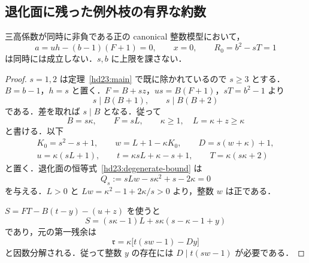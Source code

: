 \subsection{退化面に残った例外枝の有界な約数}

\begin{theorem}[退化面の例外枝の排除]
\label{ax24:degenerate-R1}
三高係数が同時に非負である正の canonical 整数模型において，
\[
 a=uh-(b-1)(F+1)=0,\qquad x=0,\qquad R_0=b^2-sT=1
\]
は同時には成立しない．$s,b$ に上限を課さない．
\end{theorem}

\begin{proof}
$s=1,2$ は定理~\ref{hd23:main} で既に除かれているので $s\ge3$ とする．
$B=b-1$，$h=s$ と置く．$F=B+sz$，$us=B(F+1)$，$sT=b^2-1$ より
\[
 s\mid B(B+1),\qquad s\mid B(B+2)
\]
である．差を取れば $s\mid B$ となる．従って
\[
 B=s\kappa,\qquad F=sL,\qquad
 \kappa\ge1,\quad L=\kappa+z\ge\kappa
\]
と書ける．以下
\begin{equation}\label{ax24:degenerate-data}
 \begin{gathered}
 K_0=s^2-s+1,\qquad
 w=L+1-\kappa K_0,\qquad D=s(w+\kappa)+1,\\
 u=\kappa(sL+1),\qquad
 t=\kappa sL+\kappa-s+1,\qquad
 T=\kappa(s\kappa+2)
 \end{gathered}
\end{equation}
と置く．退化面の恒等式~\eqref{hd23:degenerate-bound} は
\begin{equation}\label{ax24:degenerate-Q}
 Q_s:=sLw-s\kappa^2+s-2\kappa=0
\end{equation}
を与える．$L>0$ と
$Lw=\kappa^2-1+2\kappa/s>0$ より，整数 $w$ は正である．

$S=FT-B(t-y)-(u+z)$ を使うと
\[
 S=(s\kappa-1)L+s\kappa(s-\kappa-1+y)
\]
であり，元の第一残余は
\begin{equation}\label{ax24:degenerate-original}
 \mathfrak r=\kappa\bigl[t(sw-1)-Dy\bigr]
\end{equation}
と因数分解される．従って整数 $y$ の存在には $D\mid t(sw-1)$ が必要である．


\end{proof}
